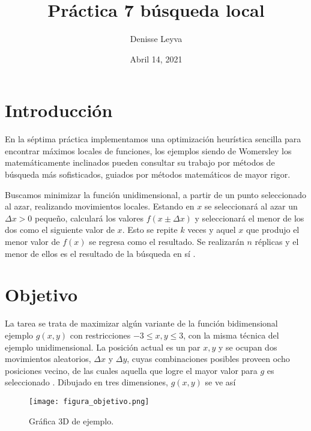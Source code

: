 \documentclass{article}
\title{Práctica 7 búsqueda local}
\author{Denisse Leyva}
\date{Abril 14, 2021}
\begin{document}
\maketitle


\section{Introducción}
En la séptima práctica implementamos una optimización heurística sencilla para encontrar máximos locales de funciones, los ejemplos siendo de Womersley\cite{Rob_Womersley} los matemáticamente inclinados pueden consultar su trabajo por métodos de búsqueda más sofisticados, guiados por métodos matemáticos de mayor rigor.

Buscamos minimizar la función unidimensional, a partir de un punto seleccionado al azar, realizando movimientos locales. Estando en $x$ se seleccionará al azar un $\Delta x > 0$  pequeño, calculará los valores $f(x \pm \Delta x)$ y seleccionará el menor de los dos como el siguiente valor de $x$. Esto se repite $k$ veces y aquel $x$ que produjo el menor valor de $f(x)$ se regresa como el resultado. Se realizarán $n$ réplicas y el menor de ellos es el resultado de la búsqueda en sí \cite{Satu_Elisa_Schaeffer}.

\section{Objetivo}
La tarea se trata de maximizar algún variante de la función bidimensional ejemplo $g(x,y)$ con restricciones $-3\leq x, y \leq 3$, con la misma técnica del ejemplo unidimensional. La posición actual es un par $x , y$ y se ocupan dos movimientos aleatorios, $\Delta x$ y $\Delta y $, cuyas combinaciones posibles proveen ocho posiciones vecino, de las cuales aquella que logre el mayor valor para $g$ es seleccionado \cite{Satu_Elisa_Schaeffer}.
Dibujado en tres dimensiones, $g(x,y)$  se ve así

\begin{figure}[H]
\centering
\texttt{[image: figura\_objetivo.png]}
\caption{\label{fig3} Gráfica 3D de ejemplo.} 
\end{figure}
\end{document}
